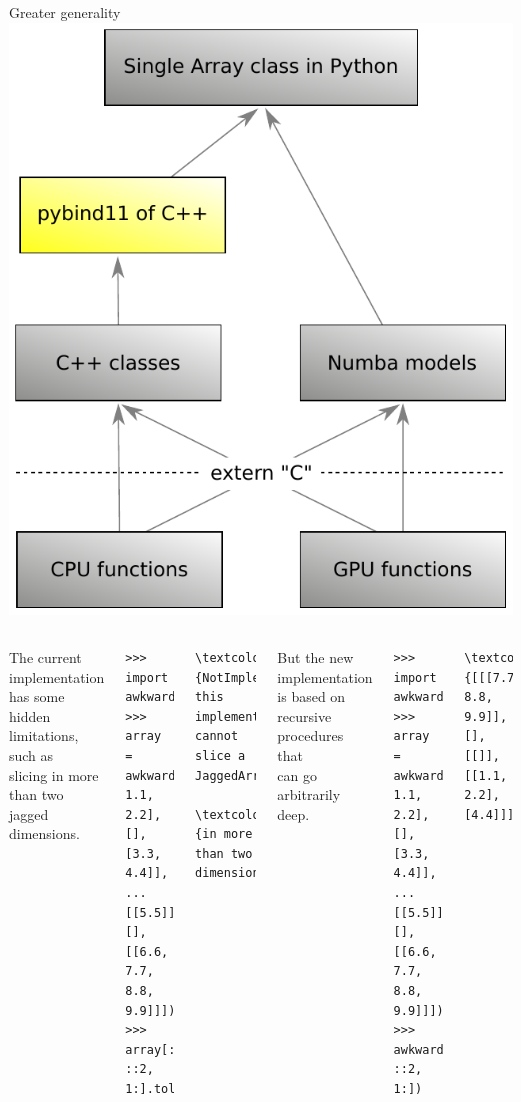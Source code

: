 \documentclass[aspectratio=169]{beamer}
\begin{document}
\begin{frame}[fragile]{Greater generality}
\large
\vspace{0.35 cm}
\hfill\mbox{\includegraphics[height=4 cm]{awkward-1-0-layers-mini-pybind11.pdf}\hspace{-0.75 cm}}

\vspace{-4 cm}
\begin{columns}
The current implementation has some hidden limitations, such as \\ slicing in more than two jagged dimensions.

\scriptsize
\begin{verbatim}
>>> import awkward
>>> array = awkward.fromiter([[[0.0, 1.1, 2.2], [], [3.3, 4.4]],
...                           [[5.5]], [], [[6.6, 7.7, 8.8, 9.9]]])
>>> array[::-1, ::2, 1:].tolist()
\end{verbatim}
\begin{Verbatim}[commandchars=\\\{\}]
\textcolor{red}{NotImplementedError: this implementation cannot slice a JaggedArray}
                     \textcolor{red}{in more than two dimensions}
\end{Verbatim}

\large
\vspace{0.5 cm}
But the new implementation is based on recursive procedures that \\ can go arbitrarily deep.

\scriptsize
\begin{verbatim}
>>> import awkward1
>>> array = awkward1.fromiter([[[0.0, 1.1, 2.2], [], [3.3, 4.4]],
...                            [[5.5]], [], [[6.6, 7.7, 8.8, 9.9]]])
>>> awkward1.tolist(array[::-1, ::2, 1:])
\end{verbatim}
\begin{Verbatim}[commandchars=\\\{\}]
\textcolor{red}{[[[7.7, 8.8, 9.9]], [], [[]], [[1.1, 2.2], [4.4]]]}
\end{Verbatim}

\vspace{5 cm}
\end{columns}
\end{frame}
\end{document}

